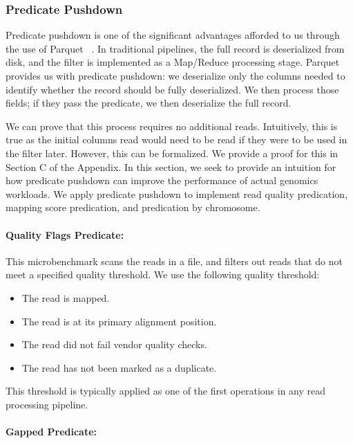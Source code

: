 \documentclass{acm_proc_article-sp}
\begin{document}
\subsubsection{Predicate Pushdown}
\label{sec:predicate-pushdown}

Predicate pushdown is one of the significant advantages afforded to us through the use of Parquet	~\cite{parquet}. In traditional
pipelines, the full record is deserialized from disk, and the filter is implemented as a Map/Reduce processing stage. Parquet provides
us with predicate pushdown: we deserialize only the columns needed to identify whether the record should be fully deserialized. We
then process those fields; if they pass the predicate, we then deserialize the full record.

We can prove that this process requires no additional reads. Intuitively, this is true as the initial columns read would need to be read
if they were to be used in the filter later. However, this can be formalized. We provide a proof for this in Section C of the Appendix.
In this section, we seek to provide an intuition for how predicate pushdown can improve the performance of actual genomics workloads.
We apply predicate pushdown to implement read quality predication, mapping score predication, and predication by chromosome. 

\paragraph{Quality Flags Predicate:}
\label{sec:quality-flags-predicate}

This microbenchmark scans the reads in a file, and filters out reads that do not meet a specified quality threshold. We use the following
quality threshold:

\begin{itemize}
\item The read is mapped.
\item The read is at its primary alignment position.
\item The read did not fail vendor quality checks.
\item The read has not been marked as a duplicate.
\end{itemize}
This threshold is typically applied as one of the first operations in any read processing pipeline.

\paragraph{Gapped Predicate:}
\label{sec:gapped-predicate}
\end{document}
